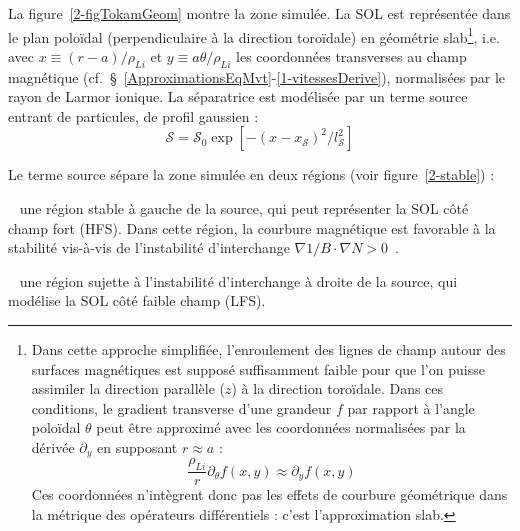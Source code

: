 \begin{refsection}
La figure~\ref{2-figTokamGeom} montre la zone simulée. La SOL est représentée dans le plan
poloïdal (perpendiculaire à la direction toroïdale)
en géométrie slab\footnote{Dans cette approche simplifiée, l'enroulement des
lignes de champ autour des surfaces magnétiques est supposé suffisamment
faible pour que l'on puisse assimiler la direction parallèle ($z$) à la
direction toroïdale. Dans ces conditions, le gradient transverse d'une
grandeur $f$ par rapport à l'angle poloïdal $\theta$ peut être approximé avec
les coordonnées normalisées par la dérivée $\partial_y$ en supposant $r\approx
a$ :
$$\frac{\rho_{Li}}{r}\partial_\theta f(x,y)\approx\partial_y
f(x,y)$$
Ces coordonnées n'intègrent donc pas les effets de courbure géométrique dans
la métrique des opérateurs différentiels : c'est l'approximation slab.}, i.e.
avec $x\equiv(r-a)/\rho_{Li}$ et $y\equiv a\theta/\rho_{Li}$ les coordonnées
transverses au champ magnétique
(cf.~\S~\ref{ApproximationsEqMvt}-\ref{1-vitessesDerive}), normalisées par le
rayon de Larmor ionique.
La séparatrice est modélisée par un terme source entrant de particules, de profil gaussien :
\begin{equation}
\mathcal S=\mathcal{S}_0 \exp[-(x-x_\mathcal{S})^2/l_\mathcal{S}^2]
\end{equation}

\begin{minipage}{1\textwidth}
\begin{minipage}{0.4\textwidth}
Le terme source sépare la zone
simulée en deux régions (voir figure~\ref{2-stable}) :

  ~ une région stable à gauche
  de la source, qui peut représenter la SOL côté champ fort (HFS\footnotemark{}).
  Dans cette région, la courbure magnétique est favorable à la stabilité vis-à-vis de l'instabilité
  d'interchange $\nabla 1/B\cdot\nabla N>0$~\parencite{Garbet}.
  
  ~ une région sujette à l'instabilité d'interchange à
  droite de la source, qui modélise la SOL côté faible champ 
  (LFS).


\end{minipage}
\end{minipage}
\end{refsection}

